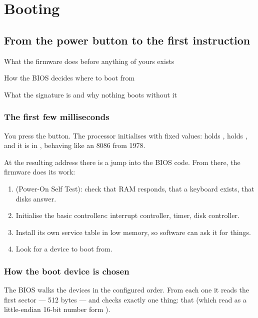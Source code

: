 \part{Booting}

\chapter{From the power button to the first instruction}

\begin{goals}
  \item What the firmware does before anything of yours exists
  \item How the BIOS decides where to boot from
  \item What the  signature is and why nothing boots without it
\end{goals}

\section{The first few milliseconds}

You press the button. The processor initialises with fixed values:  holds ,
 holds , and it is in , behaving like an 8086 from 1978.

At the resulting address there is a jump into the BIOS code. From there, the firmware does its
work:

\begin{enumerate}
  \item {} (Power-On Self Test): check that RAM responds, that a keyboard exists, that
        disks answer.
  \item Initialise the basic controllers: interrupt controller, timer, disk controller.
  \item Install its own service table in low memory, so software can ask it for things.
  \item Look for a device to boot from.
\end{enumerate}

\section{How the boot device is chosen}

The BIOS walks the devices in the configured order. From each one it reads the first sector ---
512 bytes --- and checks exactly one thing: that  (which read as a little-endian 16-bit number form ).

